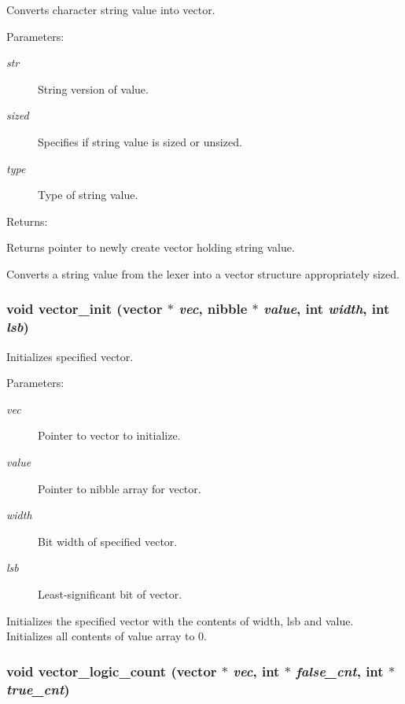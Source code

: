 Converts character string value into vector.

\begin{Desc}
\item[Parameters: ]\par
\begin{description}
\item[{\em 
str}]String version of value. \item[{\em 
sized}]Specifies if string value is sized or unsized. \item[{\em 
type}]Type of string value.\end{description}
\end{Desc}
\begin{Desc}
\item[Returns: ]\par
Returns pointer to newly create vector holding string value.\end{Desc}
Converts a string value from the lexer into a vector structure appropriately sized. 
\subsubsection{\setlength{\rightskip}{0pt plus 5cm}void vector\_\-init ({\bf vector} $\ast$ {\em vec}, {\bf nibble} $\ast$ {\em value}, int {\em width}, int {\em lsb})}\label{vector_8c_a7}


Initializes specified vector.

\begin{Desc}
\item[Parameters: ]\par
\begin{description}
\item[{\em 
vec}]Pointer to vector to initialize. \item[{\em 
value}]Pointer to nibble array for vector. \item[{\em 
width}]Bit width of specified vector. \item[{\em 
lsb}]Least-significant bit of vector.\end{description}
\end{Desc}
Initializes the specified vector with the contents of width, lsb and value. Initializes all contents of value array to 0. 
\subsubsection{\setlength{\rightskip}{0pt plus 5cm}void vector\_\-logic\_\-count ({\bf vector} $\ast$ {\em vec}, int $\ast$ {\em false\_\-cnt}, int $\ast$ {\em true\_\-cnt})}\label{vector_8c_a23}


